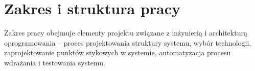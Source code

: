 \section{Zakres i struktura pracy} \label{intro_scope}

Zakres pracy obejmuje elementy projektu związane z
inżynierią i architekturą oprogramowania -- proces projektowania struktury systemu,
wybór technologii, zaprojektowanie punktów stykowych w systemie, automatyzacja
procesu wdrażania i testowania systemu.


